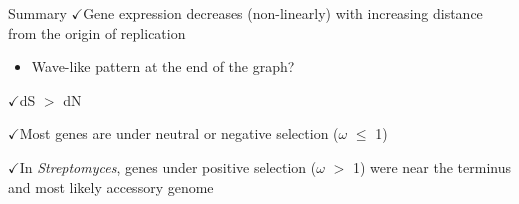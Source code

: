 \documentclass{beamer}
\makeatletter
\newcommand{\bi}{\begin{itemize}}
\newcommand{\ei}{\end{itemize}}
\newcommand{\itm}{\item<itm@1->}
\newcommand{\strep}{\textit{Streptomyces}\xspace}
\newcommand{\ch}{$\checkmark$}
\newcommand\FourQuad[4]{%
	\begin{minipage}[b][.35\textheight][t]{.47\textwidth}#1\end{minipage}\hfill%
	\begin{minipage}[b][.35\textheight][t]{.47\textwidth}#2\end{minipage}\\[0.5em]
	\begin{minipage}[b][.35\textheight][t]{.47\textwidth}#3\end{minipage}\hfill
	\begin{minipage}[b][.35\textheight][t]{.47\textwidth}#4\end{minipage}%
}
\makeatother
\begin{document}
\begin{frame}{Summary}
	\ch Gene expression decreases (non-linearly) with increasing distance from the origin of replication
	\bi
	\itm  Wave-like pattern at the end of the graph?
	\ei

	\ch dS $>$ dN

	\ch Most genes are under neutral or negative selection ($\omega$ $\le$ 1)

	\ch In \strep, genes under positive selection ($\omega$ $>$ 1) were near the terminus and most likely accessory genome
\end{frame}
%
%		
%
%
%		
%
\end{document}
